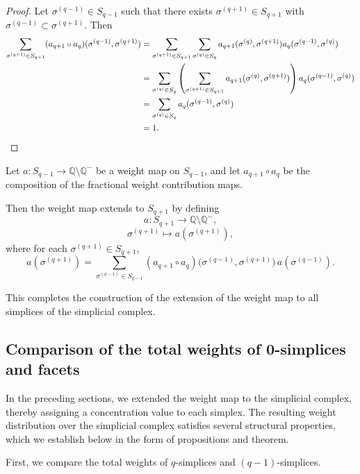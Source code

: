 \documentclass[12pt]{article}
\theoremstyle{normalhead_nobrackets}
\theoremstyle{exampstyle}
\begin{document}
\begin{proof}
\noindent
{}
Let $\sigma^{(q-1)} \in S_{q-1}$ such that there exists
$\sigma^{(q+1)} \in S_{q+1}$ with
$\sigma^{(q-1)} \subset \sigma^{(q+1)}$.
Then
\begin{align*}
\sum_{\sigma^{(q+1)} \in S_{q+1}}
(a_{q+1} \circ a_q)(\sigma^{(q-1)}, \sigma^{(q+1)})
&=
\sum_{\sigma^{(q+1)} \in S_{q+1}}
\sum_{\sigma^{(q)} \in S_q}
a_{q+1}(\sigma^{(q)}, \sigma^{(q+1)})
a_q(\sigma^{(q-1)}, \sigma^{(q)}) \notag \\
&=
\sum_{\sigma^{(q)} \in S_q}
\left(
\sum_{\sigma^{(q+1)} \in S_{q+1}}
a_{q+1}(\sigma^{(q)}, \sigma^{(q+1)})
\right)
a_q(\sigma^{(q-1)}, \sigma^{(q)}) \notag \\
&=
\sum_{\sigma^{(q)} \in S_q}
a_q(\sigma^{(q-1)}, \sigma^{(q)}) \notag \\
&= 1.
\end{align*}
\end{proof}


Let $a : S_{q-1} \to \mathbb{Q} \setminus \mathbb{Q}^-$ 
be a weight map on $S_{q-1}$, and let 
$a_{q+1} \circ a_q$ be the composition of the fractional weight contribution maps.

Then the weight map extends to $S_{q+1}$ by defining
\[
a : S_{q+1} \longrightarrow \mathbb{Q} \setminus \mathbb{Q}^-,
\]
\[
\sigma^{(q+1)} \longmapsto a(\sigma^{(q+1)}),
\]
where for each $\sigma^{(q+1)} \in S_{q+1}$,
\[
a(\sigma^{(q+1)}) =
\sum_{\sigma^{(q-1)} \in S_{q-1}}
(a_{q+1} \circ a_q)
\bigl(\sigma^{(q-1)}, \sigma^{(q+1)}\bigr)
\, a(\sigma^{(q-1)}).
\]

This completes the construction of the extension of the weight map to all simplices of the simplicial complex.


\subsection{Comparison of the total weights of 0-simplices and facets}

In the preceding sections, we extended the weight map to the simplicial complex, thereby assigning a concentration value to each simplex. The resulting weight distribution over the simplicial complex satisfies several structural properties, which we establish below in the form of propositions and theorem.

First, we compare the total weights of $q$-simplices and $(q-1)$-simplices.
\end{document}
